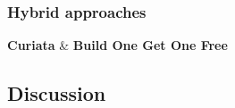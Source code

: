 \subsubsection{Hybrid approaches}

\textbf{Curiata} \& \textbf{Build One Get One Free}

\subsection{Discussion}






